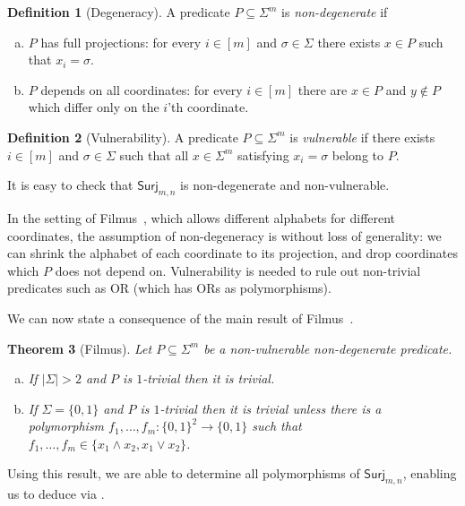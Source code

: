 \documentclass{article}
\providecommand{\Surj}{\mathsf{Surj}}
\newtheorem{theorem}{Theorem}[section]
\theoremstyle{definition}
\newtheorem{definition}[theorem]{Definition}
\theoremstyle{remark}
\begin{document}
\begin{definition}[Degeneracy]
\label{def:degeneracy}
A predicate $P \subseteq \Sigma^m$ is \emph{non-degenerate} if
\begin{enumerate}[(a)]
\item $P$ has full projections: for every $i \in [m]$ and $\sigma \in \Sigma$ there exists $x \in P$ such that $x_i = \sigma$.
\item $P$ depends on all coordinates: for every $i \in [m]$ there are $x \in P$ and $y \notin P$ which differ only on the $i$'th coordinate.
\end{enumerate}
\end{definition}

\begin{definition}[Vulnerability]
\label{def:vulnerability}
A predicate $P \subseteq \Sigma^m$ is \emph{vulnerable} if there exists $i \in [m]$ and $\sigma \in \Sigma$ such that all $x \in \Sigma^m$ satisfying $x_i = \sigma$ belong to $P$.
\end{definition}

It is easy to check that $\Surj_{m,n}$ is non-degenerate and non-vulnerable.

In the setting of Filmus~\cite{Filmus26}, which allows different alphabets for different coordinates, the assumption of non-degeneracy is without loss of generality: we can shrink the alphabet of each coordinate to its projection, and drop coordinates which $P$ does not depend on. Vulnerability is needed to rule out non-trivial predicates such as OR (which has ORs as polymorphisms).

We can now state a consequence of the main result of Filmus~\cite{Filmus26}.

\begin{theorem}[Filmus]
\label{thm:filmus}
Let $P \subseteq \Sigma^m$ be a non-vulnerable non-degenerate predicate.

\begin{enumerate}[(a)]
\item If $|\Sigma| > 2$ and $P$ is $1$-trivial then it is trivial.
\item If $\Sigma = \{0,1\}$ and $P$ is $1$-trivial then it is trivial unless there is a polymorphism $f_1,\dots,f_m\colon \{0,1\}^2 \to \{0,1\}$ such that $f_1,\dots,f_m \in \{x_1 \land x_2, x_1 \lor x_2\}$.
\end{enumerate}
\end{theorem}

Using this result, we are able to determine all polymorphisms of $\Surj_{m,n}$, enabling us to deduce  via .
\end{document}
